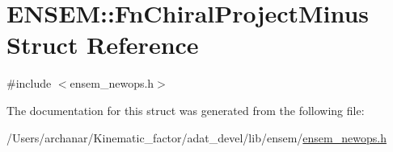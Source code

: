 \hypertarget{structENSEM_1_1FnChiralProjectMinus}{}\section{E\+N\+S\+EM\+:\+:Fn\+Chiral\+Project\+Minus Struct Reference}
\label{structENSEM_1_1FnChiralProjectMinus}


{\ttfamily \#include $<$ensem\+\_\+newops.\+h$>$}



The documentation for this struct was generated from the following file\+:\begin{DoxyCompactItemize}
\item 
/\+Users/archanar/\+Kinematic\+\_\+factor/adat\+\_\+devel/lib/ensem/\mbox{\hyperlink{lib_2ensem_2ensem__newops_8h}{ensem\+\_\+newops.\+h}}\end{DoxyCompactItemize}
